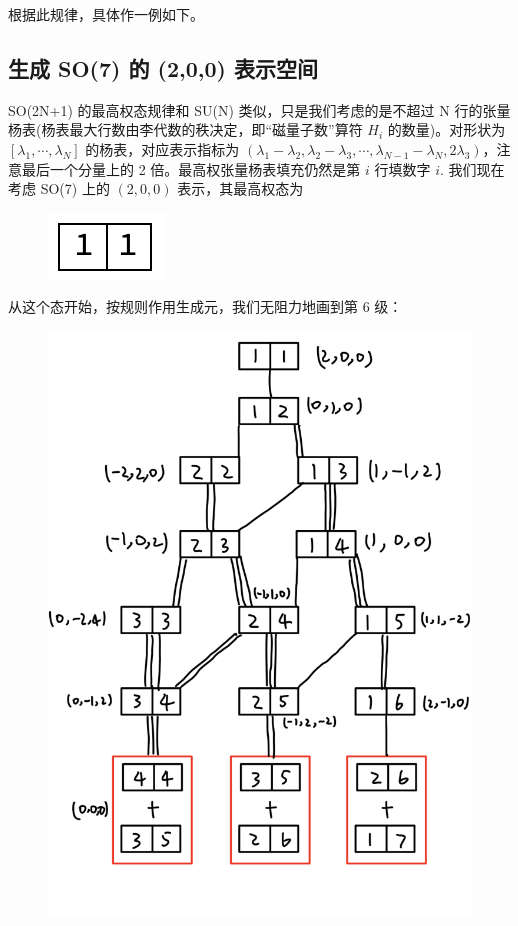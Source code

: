 \documentclass[UTF8]{ctexart}
\begin{document}
\noindent 根据此规律，具体作一例如下。

\subsection*{生成 SO(7) 的 (2,0,0) 表示空间}

\noindent SO(2N+1) 的最高权态规律和 SU(N) 类似，只是我们考虑的是不超过 N 行的张量杨表(杨表最大行数由李代数的秩决定，即“磁量子数”算符 $H_i$ 的数量)。对形状为 $[\lambda_1 ,\cdots, \lambda_N]$ 的杨表，对应表示指标为 $(\lambda_1 - \lambda_2, \lambda_2-\lambda_3, \cdots,\lambda_{N-1}-\lambda_N, 2 \lambda_3)$，注意最后一个分量上的 2 倍。最高权张量杨表填充仍然是第 $i$ 行填数字 $i$. 我们现在考虑 SO(7) 上的 $(2,0,0)$ 表示，其最高权态为

\begin{figure}[H]
\begin{centering}
\includegraphics[width=0.15\linewidth]{include/Y12}
\par\end{centering}
\end{figure}

\noindent 从这个态开始，按规则作用生成元，我们无阻力地画到第 6 级：

\begin{figure}[H]
\begin{centering}
\includegraphics[width=0.5\linewidth]{include/T6}
\par\end{centering}
\end{figure}
\end{document}
